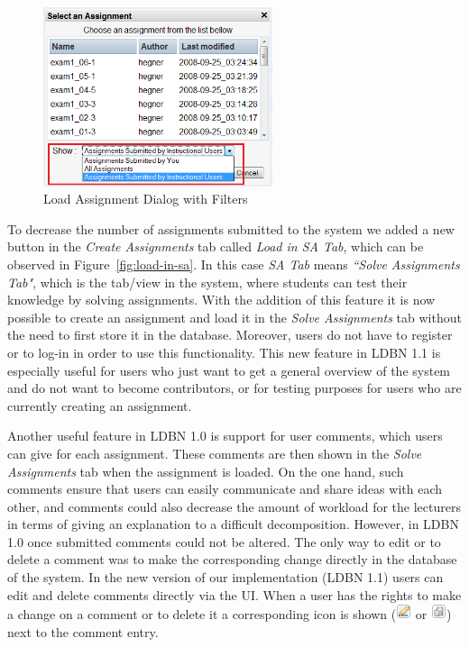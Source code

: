 \begin{figure}[h]
	\begin{center}
		\includegraphics[width=0.6\textwidth]{./img/load-assg.png}
		\caption{Load Assignment Dialog with Filters}
		\label{fig:load-assg}
	\end{center}
\end{figure}

To decrease the number of assignments submitted to the system we added a new button
in the \emph{Create Assignments} tab called \emph{Load in SA Tab}, 
which can be observed in Figure~\ref{fig:load-in-sa}. 
In this case \emph{SA Tab} means \emph{``Solve Assignments Tab"},
which is the tab/view in the system, where students can test their knowledge by solving assignments. 
With the addition of this feature it is now possible to create an assignment and load it 
in the \emph{Solve Assignments} tab without
the need to first store it in the database. Moreover, users do not have to register or 
to log-in in order to use this
functionality. This new feature in LDBN 1.1 is especially useful for users who 
just want to get a general overview of the system and
do not want to become contributors, 
or for testing purposes for users who are currently creating an assignment. 

Another useful feature in LDBN 1.0 is support for user comments, 
which users can give for each assignment. These comments
are then shown in the \emph{Solve Assignments} tab when the assignment is loaded. On the one
hand, such comments ensure that users can easily communicate and share ideas with each
other, and comments could also decrease the amount of workload
for the lecturers in terms of giving an explanation to a difficult decomposition. However, in LDBN 1.0  
once submitted comments could not be altered. The only way to edit or to delete a
comment was to make the corresponding change directly in the database of the system. 
In the new version of our implementation (LDBN 1.1) 
users can edit and delete comments directly via the UI. When a user has
the rights to make a change on a comment or to delete it a corresponding icon is shown 
(\includegraphics[scale=0.7]{./img/edit.png} or \includegraphics[scale=0.7]{./img/del.png})
next to the comment entry.

